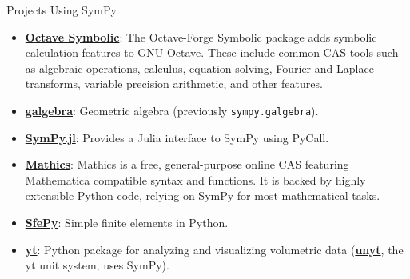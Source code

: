 \documentclass[xcolor=svgnames]{beamer}
\begin{document}
\begin{frame}{Projects Using SymPy}
\begin{itemize}
\item
  \href{http://octave.sourceforge.net/symbolic/}{\textbf{Octave Symbolic}}:
  The Octave-Forge Symbolic package adds symbolic calculation features
  to GNU Octave. These include common CAS tools such
  as algebraic operations, calculus, equation solving, Fourier and
  Laplace transforms, variable precision arithmetic, and other features.
\item
  \href{https://github.com/brombo/galgebra}{\textbf{galgebra}}:
  Geometric algebra (previously \texttt{sympy.galgebra}).
\item
  \href{https://github.com/jverzani/SymPy.jl}{\textbf{SymPy.jl}}:
  Provides a Julia interface to SymPy using PyCall.
\item
  \href{https://mathics.github.io/}{\textbf{Mathics}}: Mathics is a
  free, general-purpose online CAS featuring Mathematica compatible
  syntax and functions. It is backed by highly extensible Python code,
  relying on SymPy for most mathematical tasks.
\item
  \href{http://sfepy.org/}{\textbf{SfePy}}: Simple finite elements in
  Python.
\item
  \href{https://yt-project.org/}{\textbf{yt}}: Python package for
  analyzing and visualizing volumetric data
  (\href{https://unyt.readthedocs.io/en/stable/}{\textbf{unyt}}, the yt unit
  system, uses SymPy).
\end{itemize}
\end{frame}
\end{document}
